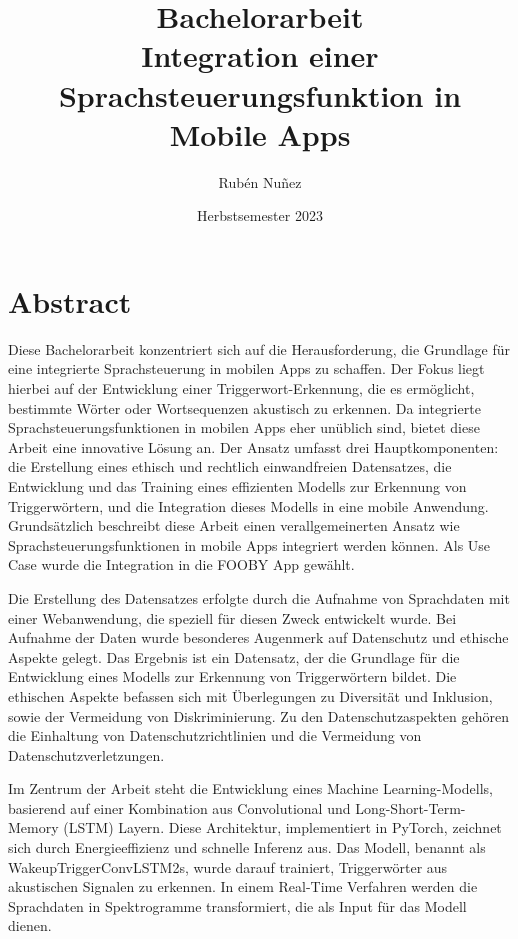 \documentclass[11pt,a4paper]{article}
\title{
	{\LARGE Bachelorarbeit}\\[2em] 
	{\textbf{Integration einer Sprachsteuerungsfunktion {\break} in Mobile Apps}}
}
\author{Rubén Nuñez}
\date{Herbstsemester 2023}
\begin{document}
\maketitle
\thispagestyle{empty} %
\newpage


\newpage

\newpage \section*{Abstract}
Diese Bachelorarbeit konzentriert sich auf die Herausforderung, die Grundlage für eine integrierte 
Sprachsteuerung in mobilen Apps zu schaffen. Der Fokus liegt hierbei auf der Entwicklung einer 
Triggerwort-Erkennung, die es ermöglicht, bestimmte Wörter oder Wortsequenzen akustisch zu erkennen. 
Da integrierte Sprachsteuerungsfunktionen in mobilen Apps eher unüblich sind, 
bietet diese Arbeit eine innovative Lösung an. Der Ansatz umfasst drei Hauptkomponenten: die 
Erstellung eines ethisch und rechtlich einwandfreien Datensatzes, die Entwicklung und das Training 
eines effizienten Modells zur Erkennung von Triggerwörtern, und die Integration dieses Modells in 
eine mobile Anwendung. Grundsätzlich beschreibt diese Arbeit einen verallgemeinerten Ansatz wie 
Sprachsteuerungsfunktionen in mobile Apps integriert werden können. Als 
Use Case wurde die Integration in die FOOBY App gewählt.


\noindent \newline
Die Erstellung des Datensatzes erfolgte durch die Aufnahme von Sprachdaten mit einer Webanwendung, 
die speziell für diesen Zweck entwickelt wurde. Bei Aufnahme der Daten wurde besonderes Augenmerk 
auf Datenschutz und ethische Aspekte gelegt. Das Ergebnis ist ein Datensatz, der die Grundlage für 
die Entwicklung eines Modells zur Erkennung von Triggerwörtern bildet. Die ethischen Aspekte 
befassen sich mit Überlegungen zu Diversität und Inklusion, sowie der Vermeidung von Diskriminierung. 
Zu den Datenschutzaspekten gehören die Einhaltung von Datenschutzrichtlinien und die Vermeidung 
von Datenschutzverletzungen.


\noindent \newline
Im Zentrum der Arbeit steht die Entwicklung eines Machine Learning-Modells, basierend auf einer 
Kombination aus Convolutional und Long-Short-Term-Memory (LSTM) Layern. Diese Architektur, 
implementiert in PyTorch, zeichnet sich durch Energieeffizienz und schnelle Inferenz aus. Das 
Modell, benannt als WakeupTriggerConvLSTM2s, wurde darauf trainiert, Triggerwörter aus 
akustischen Signalen zu erkennen. In einem Real-Time Verfahren werden die Sprachdaten in 
Spektrogramme transformiert, die als Input für das Modell dienen. 
\end{document}
